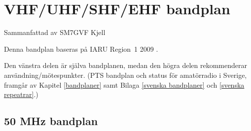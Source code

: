 \section{VHF/UHF/SHF/EHF bandplan}

Sammanfattad av SM7GVF Kjell

Denna bandplan baseras på IARU Region~1 2009 \cite{IARU1}.

Den vänstra delen är själva bandplanen, medan den högra delen rekommenderar användning/mötespunkter.
(PTS bandplan och status för amatörradio i Sverige, framgår av Kapitel \ref{bandplaner} samt Bilaga \ref{svenska bandplaner} och \ref{svenska repeatrar}.)

\subsection{50 MHz bandplan}


